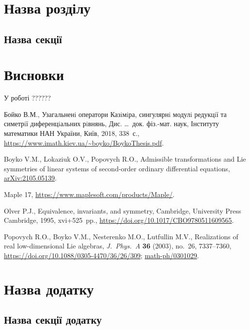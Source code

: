 \documentclass{thesis}
\begin{document}
\newpage

\chapter{Назва розділу}\label{chaper2}

\section{Назва секції}\label{section2.1}


\newpage

\chapter*{Висновки}

У роботі ??????

\newpage

\renewcommand{\bibname}{Список використаних джерел}

\begin{thebibliography}{99}
\itemsep=0pt

Бойко В.М.,
Узагальненi оператори Казiмiра,
сингулярнi модулi редукцiї
та симетрiї диференцiальних рiвнянь,
Дис. \dots\ док. фіз.-мат. наук,  Інституту математики НАН України, Київ, 2018, 338~с., \url{https://www.imath.kiev.ua/~boyko/BoykoThesis.pdf}.



Boyko V.M., Lokaziuk O.V., Popovych R.O.,
Admissible transformations and Lie symmetries of linear systems of second-order ordinary differential equations, \href{https://arxiv.org/abs/2105.05139}{arXiv:2105.05139}.

Maple 17, \url{https://www.maplesoft.com/products/Maple/}.


Olver P.J., Equivalence, invariants, and symmetry, Cambridge, University Press Cambridge, 1995, xvi+525~pp.,
\url{https://doi.org/10.1017/CBO9780511609565}.


Popovych R.O., Boyko V.M., Nesterenko M.O., Lutfullin M.V., Realizations of real low-dimensional Lie algebras, \textit{J.~Phys.~A} \textbf{36} (2003), no.~26,
7337--7360, \url{https://doi.org/10.1088/0305-4470/36/26/309}; \href{https://arxiv.org/abs/math-ph/0301029}{math-ph/0301029}.



\end{thebibliography}

\appendix

\chapter{Назва додатку}\label{appendix1}

\section{Назва секції додатку}\label{appendix1.1}
\end{document}
